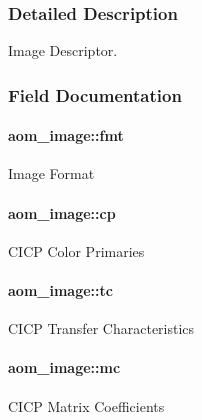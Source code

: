 \subsubsection{Detailed Description}
Image Descriptor. 

\subsubsection{Field Documentation}
\paragraph[{\texorpdfstring{fmt}{fmt}}]{ aom\+\_\+image\+::fmt}\hypertarget{structaom__image_a6c64b1ab918d80d52eb8f5d6d957e825}{}\label{structaom__image_a6c64b1ab918d80d52eb8f5d6d957e825}
Image Format 
\paragraph[{\texorpdfstring{cp}{cp}}]{ aom\+\_\+image\+::cp}\hypertarget{structaom__image_aeff339c4b3d37ce2528bce37418bdaa6}{}\label{structaom__image_aeff339c4b3d37ce2528bce37418bdaa6}
C\+I\+CP Color Primaries 
\paragraph[{\texorpdfstring{tc}{tc}}]{ aom\+\_\+image\+::tc}\hypertarget{structaom__image_aa7f7bf00699076f824460be08a0e1e65}{}\label{structaom__image_aa7f7bf00699076f824460be08a0e1e65}
C\+I\+CP Transfer Characteristics 
\paragraph[{\texorpdfstring{mc}{mc}}]{ aom\+\_\+image\+::mc}\hypertarget{structaom__image_a47c4dda09afa07d6eb0dd0de8cd31838}{}\label{structaom__image_a47c4dda09afa07d6eb0dd0de8cd31838}
C\+I\+CP Matrix Coefficients 
